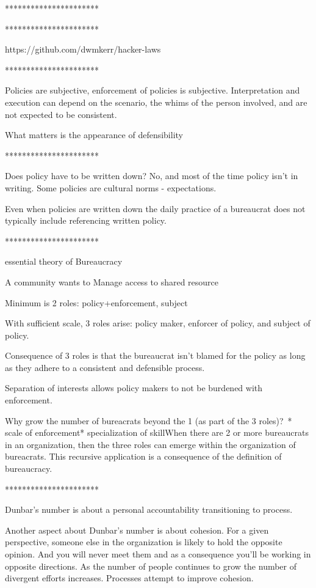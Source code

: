 **********************

**********************

https://github.com/dwmkerr/hacker-laws

**********************

Policies are subjective, enforcement of policies is subjective. Interpretation and execution can depend on the scenario, the whims of the person involved, and are not expected to be consistent.

What matters is the appearance of defensibility

**********************

Does policy have to be written down? 
No, and most of the time policy isn't in writing. Some policies are cultural norms - expectations. 

Even when policies are written down the daily practice of a bureaucrat does not typically include referencing written policy.

**********************

essential theory of Bureaucracy

A community wants to Manage access to shared resource

Minimum is 2 roles: policy+enforcement, subject

With sufficient scale, 3 roles arise: policy maker, enforcer of policy, and subject of policy.

Consequence of 3 roles is that the bureaucrat isn't blamed for the policy as long as they adhere to a consistent and defensible process. 

Separation of interests allows policy makers to not be burdened with enforcement.

Why grow the number of bureacrats beyond the 1 (as part of the 3 roles)? * scale of enforcement* specialization of skillWhen there are 2 or more bureaucrats in an organization, then the three roles can emerge within the organization of bureacrats. This recursive application is a consequence of the definition of bureaucracy.

**********************

Dunbar's number is about a personal accountability transitioning to process.

Another aspect about Dunbar's number is about cohesion. For a given perspective, someone else in the organization is likely to hold the opposite opinion. And you will never meet them and as a consequence you'll be working in opposite directions. As the number of people continues to grow the number of divergent efforts increases. Processes attempt to improve cohesion.

